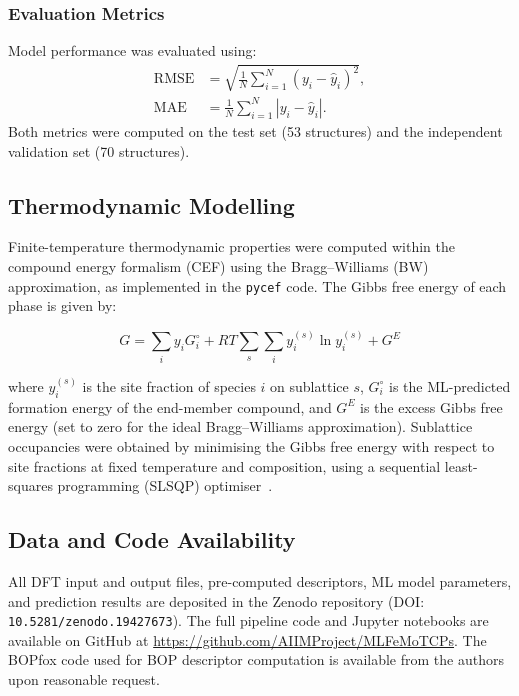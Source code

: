\subsubsection*{Evaluation Metrics}

Model performance was evaluated using:
\begin{align}
  \text{RMSE} &= \sqrt{\frac{1}{N} \sum_{i=1}^{N} (y_i - \hat{y}_i)^2}, \\
  \text{MAE} &= \frac{1}{N} \sum_{i=1}^{N} |y_i - \hat{y}_i|.
\end{align}
Both metrics were computed on the test set (53 structures) and the independent validation set (70 structures).

\subsection{Thermodynamic Modelling}

Finite-temperature thermodynamic properties were computed within the compound energy formalism (CEF) using the Bragg--Williams (BW) approximation, as implemented in the \texttt{pycef} code. The Gibbs free energy of each phase is given by:

\begin{equation}
  G = \sum_i y_i G_i^\circ + RT \sum_s \sum_i y_i^{(s)} \ln y_i^{(s)} + G^E
  \label{eq:gibbs}
\end{equation}

where $y_i^{(s)}$ is the site fraction of species $i$ on sublattice $s$, $G_i^\circ$ is the ML-predicted formation energy of the end-member compound, and $G^E$ is the excess Gibbs free energy (set to zero for the ideal Bragg--Williams approximation). Sublattice occupancies were obtained by minimising the Gibbs free energy with respect to site fractions at fixed temperature and composition, using a sequential least-squares programming (SLSQP) optimiser~\cite{slsqp}.

\subsection{Data and Code Availability}

All DFT input and output files, pre-computed descriptors, ML model parameters, and prediction results are deposited in the Zenodo repository (DOI: \texttt{10.5281/zenodo.19427673}). The full pipeline code and Jupyter notebooks are available on GitHub at \url{https://github.com/AIIMProject/MLFeMoTCPs}. The BOPfox code used for BOP descriptor computation is available from the authors upon reasonable request.
